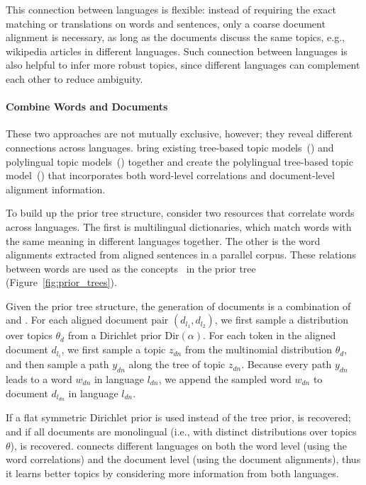 This connection between languages is flexible: instead of requiring
the exact matching or translations on words and sentences, only a
coarse document alignment is necessary, as long as the documents
discuss the same topics, e.g., wikipedia articles in different
languages. Such connection between languages is also helpful to infer
more robust topics, since different languages can complement each
other to reduce ambiguity.


\paragraph{\bf Combine Words and Documents}

These two approaches are not mutually exclusive, however; they reveal
different connections across languages. \citet{hu-14} bring existing
tree-based topic models~(\tlda{}) and polylingual topic
models~(\plda{}) together and create the polylingual tree-based topic
model~(\ptlda{}) that incorporates both word-level correlations and
document-level alignment information.

To build up the prior tree structure, \citet{hu-14} consider two
resources that correlate words across languages. The first is
multilingual dictionaries, which match words with the same meaning in
different languages together. The other is the word alignments
extracted from aligned sentences in a parallel corpus. These relations
between words are used as the concepts~\citep{Bhattacharya-2006} in
the prior tree (Figure~\ref{fig:prior_trees}).

Given the prior tree structure, the generation of documents is a
combination of \tlda{} and \plda{}.  For each aligned document pair
$(d_{l_1}, d_{l_2})$, we first sample a distribution over topics
$\theta_d$ from a Dirichlet prior $\text{Dir}(\alpha)$.  For each
token in the aligned document $d_{l_i}$, we first sample a topic
$z_{dn}$ from the multinomial distribution $\theta_d$, and then sample
a path $y_{dn}$ along the tree of topic $z_{dn}$. Because every path
$y_{dn}$ leads to a word $w_{dn}$ in language $l_{dn}$, we append the
sampled word $w_{dn}$ to document $d_{l_{dn}}$ in language $l_{dn}$.

If a flat symmetric Dirichlet prior is used instead of the tree prior,
\plda{} is recovered; and if all documents are monolingual (i.e., with
distinct distributions over topics $\theta$), \tlda{} is
recovered. \ptlda{} connects different languages on both the word
level (using the word correlations) and the document level (using the
document alignments), thus it learns better topics by considering more
information from both languages.

